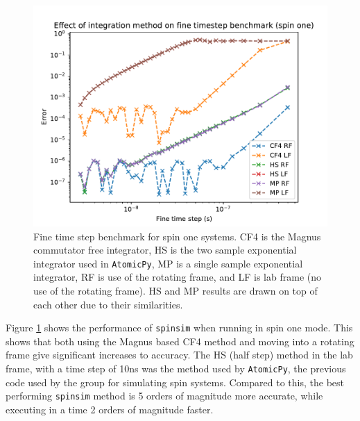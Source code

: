 \documentclass{jors}
\begin{document}
			\begin{figure}[h!]
				\includegraphics[scale=0.9]{benchmark_comparison_spin_one_publication.pdf}
				\caption{Fine time step benchmark for spin one systems. CF4 is the Magnus commutator free integrator, HS is the two sample exponential integrator used in \texttt{AtomicPy}, MP is a single sample exponential integrator, RF is use of the rotating frame, and LF is lab frame (no use of the rotating frame). HS and MP results are drawn on top of each other due to their similarities.}
				\label{fig:benchmark_comparison_spin_one}
			\end{figure}

			Figure \ref{fig:benchmark_comparison_spin_one} shows the performance of \texttt{spinsim} when running in spin one mode. This shows that both using the Magnus based CF4 method and moving into a rotating frame give significant increases to accuracy. The HS (half step) method in the lab frame, with a time step of 10ns was the method used by \texttt{AtomicPy}, the previous code used by the group for simulating spin systems. Compared to this, the best performing \texttt{spinsim} method is 5 orders of magnitude more accurate, while executing in a time 2 orders of magnitude faster.
\end{document}
